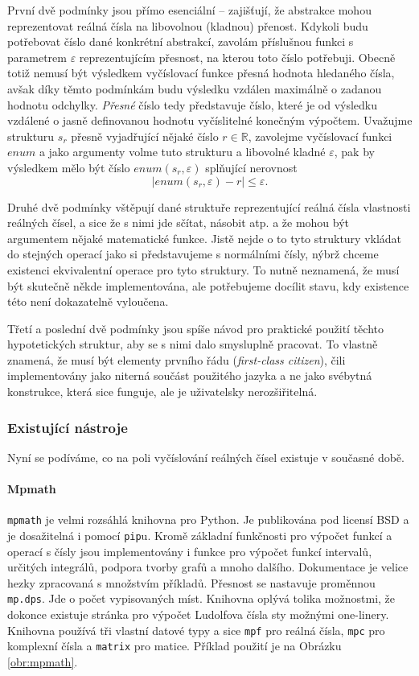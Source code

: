 První dvě podmínky jsou přímo esenciální -- zajišťují, že abstrakce mohou reprezentovat reálná čísla na libovolnou (kladnou) přenost. Kdykoli budu potřebovat číslo dané konkrétní abstrakcí, zavolám příslušnou funkci s parametrem $\varepsilon$ reprezentujícím přesnost, na kterou toto číslo potřebuji. Obecně totiž nemusí být výsledkem vyčíslovací funkce přesná hodnota hledaného čísla, avšak díky těmto podmínkám budu výsledku vzdálen maximálně o zadanou hodnotu odchylky. \textit{Přesné} číslo tedy představuje číslo, které je od výsledku vzdálené o jasně definovanou hodnotu vyčíslitelné konečným výpočtem. Uvažujme strukturu $s_r$ přesně vyjadřující nějaké číslo $r\in\mathbb{R}$, zavolejme vyčíslovací funkci $enum$ a jako argumenty volme tuto strukturu a libovolné kladné $\varepsilon$, pak by výsledkem mělo být číslo $enum(s_r, \varepsilon)$ splňující nerovnost
\begin{equation}\label{ner:struktura}
|enum(s_r, \varepsilon)-r| \leq \varepsilon.
\end{equation}

Druhé dvě podmínky vštěpují dané struktuře reprezentující reálná čísla vlastnosti reálných čísel, a sice že s nimi jde sčítat, násobit atp. a že mohou být argumentem nějaké matematické funkce. Jistě nejde o to tyto struktury vkládat do stejných operací jako si představujeme s normálními čísly, nýbrž chceme existenci ekvivalentní operace pro tyto struktury. To nutně neznamená, že musí být skutečně někde implementována, ale potřebujeme docílit stavu, kdy existence této není dokazatelně vyloučena.

Třetí a poslední dvě podmínky jsou spíše návod pro praktické použití těchto hypotetických struktur, aby se s nimi dalo smysluplně pracovat. To vlastně znamená, že musí být elementy prvního řádu (\textit{first-class citizen}), čili implementovány jako niterná součást použitého jazyka a ne jako svébytná konstrukce, která sice funguje, ale je uživatelsky nerozšiřitelná.

\subsubsection{Existující nástroje}\label{ssec:knihovny}\FloatBarrier
Nyní se podíváme, co na poli vyčíslování reálných čísel existuje v současné době.
\paragraph{Mpmath \cite{mpmath}}
\texttt{mpmath} je velmi rozsáhlá knihovna pro Python. Je publikována pod licensí BSD a je dosažitelná i pomocí \texttt{pip}u. Kromě základní funkčnosti pro výpočet funkcí a operací s čísly jsou implementovány i funkce pro výpočet funkcí intervalů, určitých integrálů, podpora tvorby grafů a mnoho dalšího. Dokumentace je velice hezky zpracovaná s množstvím příkladů. Přesnost se nastavuje proměnnou \texttt{mp.dps}. Jde o počet vypisovaných míst. Knihovna oplývá tolika možnostmi, že dokonce existuje stránka pro výpočet Ludolfova čísla sty možnými one-linery. Knihovna používá tři vlastní datové typy a sice \texttt{mpf} pro reálná čísla, \texttt{mpc} pro komplexní čísla a \texttt{matrix} pro matice. Příklad použití je na Obrázku \ref{obr:mpmath}.

